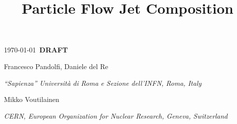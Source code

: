 \documentclass{cmspaper}
\begin{document}
\renewcommand{\arraystretch}{1.7}

\begin{titlepage}
\today ~{\bf DRAFT}
\boldmath \title{
Particle Flow Jet Composition
} \unboldmath
\begin{Authlist}
Francesco Pandolfi, Daniele del Re
%
\begin{center}
 \begin{small}
 {\it ``Sapienza'' Universit\`{a} di Roma e Sezione dell'INFN, Roma, Italy} \\
\end{small}
\vspace{1cm}
Mikko Voutilainen
\begin{small}
\begin{center}
{\it CERN, European Organization for Nuclear Research, Geneva, Switzerland}
\end{center}
\end{small}
\end{center}
\end{Authlist}

\end{titlepage}
\end{document}
